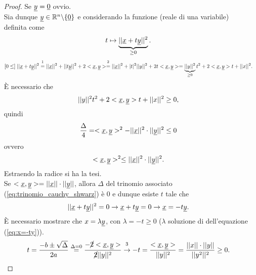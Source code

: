 \begin{proof}
    Se $\uline y=\uline 0$ ovvio.\\
    Sia dunque $\uline y\in\mathbb R^n\backslash\{\uline 0\}$ e considerando la funzione (reale di una variabile) definita come
    \begin{equation*}
        t\mapsto\underbrace{||\uline x+t\uline y||^2}_{\geq 0}.
    \end{equation*}
    \begin{equation}\label{eq:trinomio_cauchy_shwarz}
        [0\leq]\; ||\uline x+t\uline y||^2\overset{\footnotemark}{=}||\uline x||^2+||t\uline y||^2+2<\uline x,\uline y>\overset{\footnotemark}{=}||\uline x||^2+|t|^2||y||^2+2t<\uline x,\uline y> = \underbrace{||y||^2}_{\geq 0}t^2+2<\uline x,\uline y>t + ||x||^2.
    \end{equation}
    \footnotemark È necessario che
    \begin{equation*}
        ||y||^2t^2+2<\uline x,\uline y>t + ||x||^2\geq 0,
    \end{equation*}
    quindi
    \begin{equation*}
        \frac{\Delta}{4}=<\uline x,\uline y>^2-||\uline x||^2\cdot||\uline y||^2\leq 0
    \end{equation*}
    ovvero
    \begin{equation*}
        <\uline x,\uline y>^2\leq ||\uline x||^2\cdot||\uline y||^2.
    \end{equation*}
    Estraendo la radice si ha la tesi.\\
    Se $<\uline x,\uline y>=||\uline x||\cdot||\uline y||$, allora $\Delta$ del trinomio associato (\ref{eq:trinomio_cauchy_shwarz}) è 0 e dunque esiste $t$ tale che
    \begin{equation}\label{eq:x=-ty}
        ||\uline x+t\uline y||^2=0 \rightarrow \uline x + t\uline y=0\rightarrow \uline x=-t\uline y.
    \end{equation}
    \footnotemark È necessario mostrare che $x=\lambda\uline y$, con $\lambda=-t\geq 0$ ($\lambda$ soluzione di dell'equazione (\ref{eq:x=-ty})). \footnotemark
    \begin{equation}\label{eq:soluzione_x=-ty}
        t=\frac{-b\pm\sqrt{\Delta}}{2a}\overset{\Delta=0}{=}\frac{-\cancel{2}<\uline x,\uline y>}{\cancel{2}||y||^2}\overset{\footnotemark}{\rightarrow}-t=\frac{<\uline x,\uline y>}{||y||^2}=\frac{||x||\cdot||y||}{||y^2||^2}\geq 0.
    \end{equation}
\end{proof}

